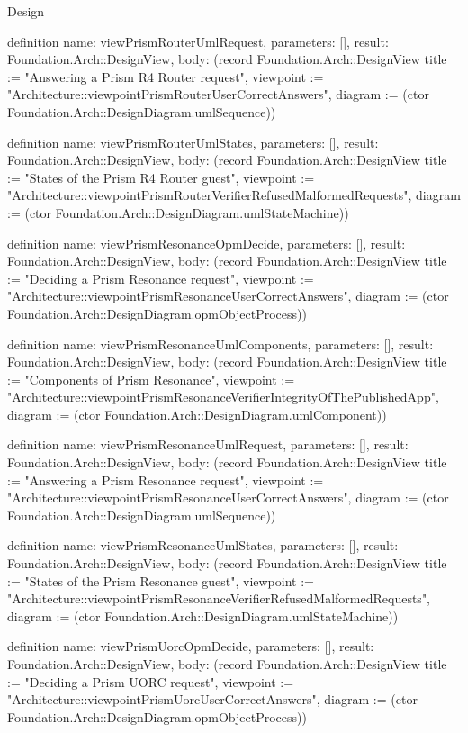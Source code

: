 \begin{lexlean}{Design}
\begin{semanticmodule}
definition{
  name: viewPrismRouterUmlRequest,
  parameters: [],
  result: Foundation.Arch::DesignView,
  body: (record Foundation.Arch::DesignView {title := "Answering a Prism R4 Router request", viewpoint := "Architecture::viewpointPrismRouterUserCorrectAnswers", diagram := (ctor Foundation.Arch::DesignDiagram.umlSequence)})
}

definition{
  name: viewPrismRouterUmlStates,
  parameters: [],
  result: Foundation.Arch::DesignView,
  body: (record Foundation.Arch::DesignView {title := "States of the Prism R4 Router guest", viewpoint := "Architecture::viewpointPrismRouterVerifierRefusedMalformedRequests", diagram := (ctor Foundation.Arch::DesignDiagram.umlStateMachine)})
}

definition{
  name: viewPrismResonanceOpmDecide,
  parameters: [],
  result: Foundation.Arch::DesignView,
  body: (record Foundation.Arch::DesignView {title := "Deciding a Prism Resonance request", viewpoint := "Architecture::viewpointPrismResonanceUserCorrectAnswers", diagram := (ctor Foundation.Arch::DesignDiagram.opmObjectProcess)})
}

definition{
  name: viewPrismResonanceUmlComponents,
  parameters: [],
  result: Foundation.Arch::DesignView,
  body: (record Foundation.Arch::DesignView {title := "Components of Prism Resonance", viewpoint := "Architecture::viewpointPrismResonanceVerifierIntegrityOfThePublishedApp", diagram := (ctor Foundation.Arch::DesignDiagram.umlComponent)})
}

definition{
  name: viewPrismResonanceUmlRequest,
  parameters: [],
  result: Foundation.Arch::DesignView,
  body: (record Foundation.Arch::DesignView {title := "Answering a Prism Resonance request", viewpoint := "Architecture::viewpointPrismResonanceUserCorrectAnswers", diagram := (ctor Foundation.Arch::DesignDiagram.umlSequence)})
}

definition{
  name: viewPrismResonanceUmlStates,
  parameters: [],
  result: Foundation.Arch::DesignView,
  body: (record Foundation.Arch::DesignView {title := "States of the Prism Resonance guest", viewpoint := "Architecture::viewpointPrismResonanceVerifierRefusedMalformedRequests", diagram := (ctor Foundation.Arch::DesignDiagram.umlStateMachine)})
}

definition{
  name: viewPrismUorcOpmDecide,
  parameters: [],
  result: Foundation.Arch::DesignView,
  body: (record Foundation.Arch::DesignView {title := "Deciding a Prism UORC request", viewpoint := "Architecture::viewpointPrismUorcUserCorrectAnswers", diagram := (ctor Foundation.Arch::DesignDiagram.opmObjectProcess)})
}


\end{semanticmodule}
\end{lexlean}
